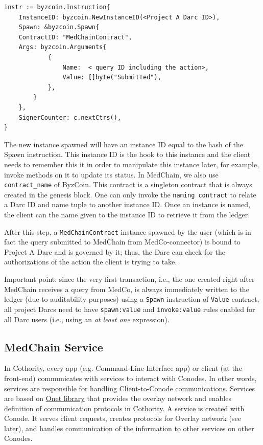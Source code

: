 \begin{verbatim}
instr := byzcoin.Instruction{
    InstanceID: byzcoin.NewInstanceID(<Project A Darc ID>),
    Spawn: &byzcoin.Spawn{
    ContractID: "MedChainContract",
    Args: byzcoin.Arguments{
		    {
		        Name:  < query ID including the action>,
		        Value: []byte("Submitted"), 
		    },
        }  
    },
    SignerCounter: c.nextCtrs(),
}
\end{verbatim}

The new instance spawned will have an instance ID equal to the hash of the Spawn instruction. This instance ID is the hook to this instance and the client needs to remember this it in order to manipulate this instance later, for example, invoke methods on it to update its status. In MedChain, we also use \texttt{contract\_name} of ByzCoin. This contract is a singleton contract that is always created in the genesis block. One can only invoke the \texttt{naming contract} to relate a Darc ID and name tuple to another instance ID. Once an instance is named, the client can the name given to the instance ID to retrieve it from the ledger.

After this step, a \texttt{MedChainContract} instance spawned by the user (which is in fact the query submitted to MedChain from MedCo-connector) is bound to Project A Darc and is governed by it; thus, the Darc can check for the authorizations of the action the client is trying to take.

Important point: since the very first transaction, i.e., the one created right after MedChain receives a query from MedCo, is always immediately written to the ledger (due to auditability purposes) using a \texttt{Spawn} instruction of \texttt{Value} contract, all project Darcs need to have \texttt{spawn:value} and \texttt{invoke:value} rules enabled for all Darc users (i.e., using an \textit{at least one} expression).


\subsection{MedChain Service}
In Cothority, every app (e.g. Command-Line-Interface app) or client (at the front-end) communicates with services to interact with Conodes. In other words, services are responsible for handling Client-to-Conode communications. Services are based on \href{https://github.com/dedis/onet}{Onet library} that provides the overlay network and enables definition of communication protocols in Cothority. A service is created with Conode. It serves client requests, creates protocols for Overlay network (see later), and handles communication of the information to other services on other Conodes. 

